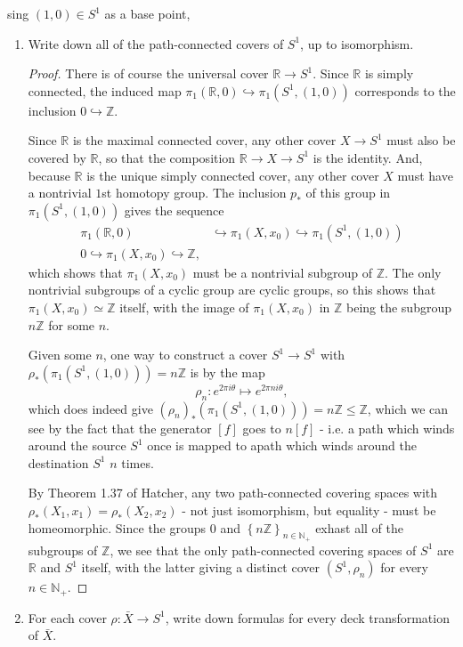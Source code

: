 \documentclass[12pt]{article}
\newcommand{\N}{\mathbb{N}}
\newcommand{\Z}{\mathbb{Z}}
\newcommand{\R}{\mathbb{R}}
\theoremstyle{definition}
\newenvironment{problem}[2][Problem]{\begin{trivlist}
\item[\hskip \labelsep {\bfseries #1}\hskip \labelsep {\bfseries #2.}]}{\end{trivlist}}
\begin{document}
\begin{problem}
	Using $(1,0) \in S^1$ as a base point,
	\begin{enumerate}[label=(\alph*)]
		\item Write down all of the path-connected covers of $S^1$, up to isomorphism.
			\begin{proof}
				There is of course the universal cover $\R \to S^1$. Since $\R$ is simply connected, the induced map $\pi_1(\R, 0) \hookrightarrow \pi_1(S^1, (1,0))$ corresponds to the inclusion $0 \hookrightarrow \Z$.
				\par Since $\R$ is the maximal connected cover, any other cover $X \to S^1$ must also be covered by $\R$, so that the composition $\R \to X \to S^1$ is the identity. And, because $\R$ is the unique simply connected cover, any other cover $X$ must have a nontrivial $1$st homotopy group. The inclusion $p_*$ of this group in $\pi_{1}(S^1, (1,0))$ gives the sequence
				\begin{align*}\pi_1(\R, 0) &\hookrightarrow  \pi_1(X, x_0)\hookrightarrow \pi_1(S^1, (1,0))\\
					0 \hookrightarrow \pi_1(X,x_0) \hookrightarrow  \Z,
				\end{align*}
				which shows that $\pi_1(X, x_0)$ must be a nontrivial subgroup of $\Z$. The only nontrivial subgroups of a cyclic group are cyclic groups, so this shows that $\pi_1(X, x_0) \simeq \Z$ itself, with the image of $\pi_1(X, x_0)$ in $\Z$ being the subgroup $n\Z$ for some $n$. 
				\par Given some $n$, one way to construct a cover $S^1 \to S^1$ with $\rho_*(\pi_1(S^1, (1,0))) = n\Z$ is by the map 
				\[\rho_n : e^{2\pi i\theta} \mapsto e^{2\pi n i\theta},\]
				which does indeed give $(\rho_n)_*(\pi_1(S^1, (1,0))) = n\Z \leq \Z$, which we can see by the fact that the generator $[f]$ goes to $n[f]$ - i.e. a path which winds around the source $S^1$ once is mapped to apath which winds around the destination $S^1$ $n$ times. 
				\par By Theorem 1.37 of Hatcher, any two path-connected covering spaces with $\rho_*(X_1, x_1) = \rho_*(X_2, x_2)$ - not just isomorphism, but equality - must be homeomorphic. Since the groups $0$ and $\left\{ n\Z \right\}_{n \in \N_+}$ exhast all of the subgroups of $\Z$, we see that the only path-connected covering spaces of $S^1$ are $\R$ and $S^1$ itself, with the latter giving a distinct cover $(S^1, \rho_n)$ for every $n \in \N_+$.
			\end{proof}
		\item For each cover $\rho: \bar X \to S^1$, write down formulas for every deck transformation of $\bar X$.

\end{enumerate}
\end{problem}
\end{document}

